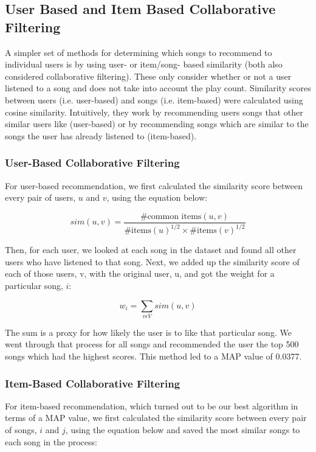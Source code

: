 \documentclass[12pt,preprint]{aastex}
\begin{document}
\subsection{User Based and Item Based Collaborative Filtering}
A simpler set of methods for determining which songs to recommend to individual users is by using user- or item/song- based similarity (both also considered collaborative filtering). These only consider whether or not a user listened to a song and does not take into account the play count. Similarity scores between users (i.e. user-based) and songs (i.e. item-based) were calculated using cosine similarity. Intuitively, they work by recommending users songs that other similar users like (user-based) or by recommending songs which are similar to the songs the user has already listened to (item-based).

\subsubsection{User-Based Collaborative Filtering}
For user-based recommendation, we first calculated the similarity score between every pair of users, $u$ and $v$, using the equation below:

\begin{equation}
sim(u,v) = \frac{\text{\# common items}(u, v)}{{\text{\# items}(u)}^{1/2} \times {\text{\# items}(v)}^{1/2}}
\end{equation}

Then, for each user, we looked at each song in the dataset and found all other users who have listened to that song. Next, we added up the similarity score of each of those users, v, with the original user, u, and got the weight for a particular song, $i$:  

$$w_i = \sum_{v \epsilon V} sim(u, v)$$

The sum is a proxy for how likely the user is to like that particular song. We went through that process for all songs and recommended the user the top 500 songs which had the highest scores. This method led to a MAP value of 0.0377.

\subsubsection{Item-Based Collaborative Filtering}
For item-based recommendation, which turned out to be our best algorithm in terms of a MAP value, we first calculated the similarity score between every pair of songs, $i$ and $j$, using the equation below and saved the most similar songs to each song in the process:
\end{document}
